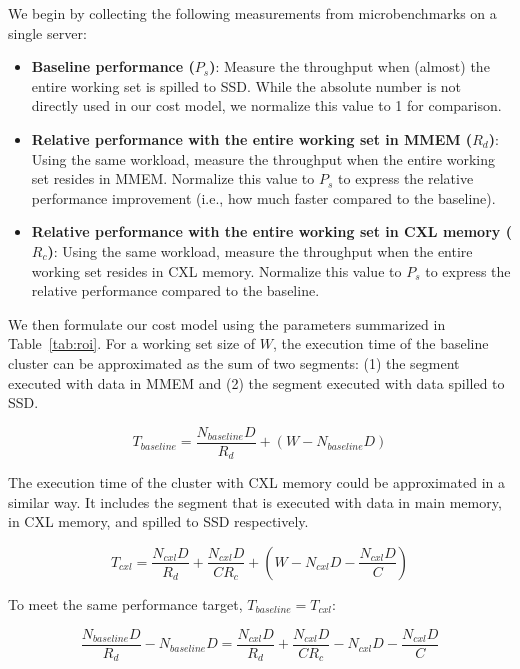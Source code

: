 We begin by collecting the following measurements from microbenchmarks on a single server:
\begin{itemize}[leftmargin=*, itemsep=0pt]
  \item \textbf{Baseline performance ($P_s$)}: Measure the throughput when (almost) the entire working set is spilled to SSD. While the absolute number is not directly used in our cost model, we normalize this value to 1 for comparison.
  \item \textbf{Relative performance with the entire working set in MMEM ($R_d$)}: Using the same workload, measure the throughput when the entire working set resides in MMEM. Normalize this value to $P_s$ to express the relative performance improvement (i.e., how much faster compared to the baseline).
  \item \textbf{Relative performance with the entire working set in CXL memory ($R_c$)}: Using the same workload, measure the throughput when the entire working set resides in CXL memory. Normalize this value to $P_s$ to express the relative performance compared to the baseline.
\end{itemize}

We then formulate our cost model using the parameters summarized in Table~\ref{tab:roi}. For a working set size of $W$, the execution time of the baseline cluster can be approximated as the sum of two segments: (1) the segment executed with data in MMEM and (2) the segment executed with data spilled to SSD.



$$
T_{baseline} = \frac{N_{baseline} D}{R_d} + (W - N_{baseline}D)
$$

The execution time of the cluster with CXL memory could be approximated in a similar way.
It includes the segment that is executed with data in main memory, in CXL memory, and spilled to SSD respectively.

$$ T_{cxl} = \frac{N_{cxl} D}{R_d} + \frac{N_{cxl} D}{CR_c} + (W - N_{cxl} D - \frac{N_{cxl} D}{C}) $$

To meet the same performance target, $T_{baseline} = T_{cxl}$:


$$
\frac{N_{baseline} D}{R_d} - N_{baseline} D = \frac{N_{cxl} D}{R_d} + \frac{N_{cxl} D}{CR_c} - N_{cxl} D - \frac{N_{cxl} D }{C}
$$



